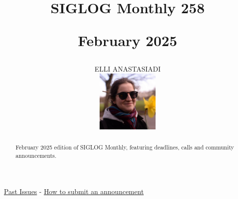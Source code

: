 \documentclass[prodmode,acmtecs]{acmsmall} %
\newcounter{colstart}
\begin{document}
\setcounter{colstart}{\thepage}

\title{{\huge\sc SIGLOG Monthly 258}

 February 2025}\author{ELLI ANASTASIADI\vspace*{-2.6cm}\begin{flushright}\includegraphics[width=30mm]{elli_anastasiadi.png}\end{flushright}}\begin{abstract}February 2025 edition of SIGLOG Monthly, featuring deadlines, calls and community announcements.
\end{abstract}


\maketitlee

\href{https://lics.siglog.org/newsletters/}{Past Issues}
 - 
\href{https://lics.siglog.org/newsletters/inst.html}{How to submit an announcement}
\end{document}
